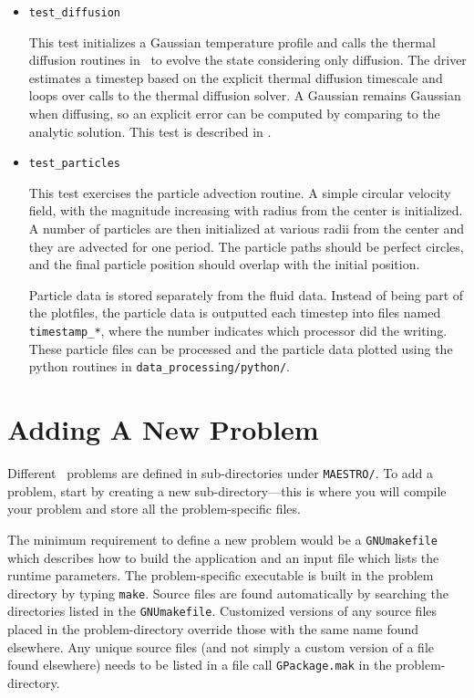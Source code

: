 \begin{itemize}
  
\item {\tt test\_diffusion}

  This test initializes a Gaussian temperature profile and calls
  the thermal diffusion routines in \maestro\ to evolve the state 
  considering only diffusion.  The driver estimates a timestep
  based on the explicit thermal diffusion timescale and loops
  over calls to the thermal diffusion solver.  A Gaussian remains
  Gaussian when diffusing, so an explicit error can be computed
  by comparing to the analytic solution.  This test is 
  described in \cite{xrb}.


\item {\tt test\_particles}

  This test exercises the particle advection routine.  A simple
  circular velocity field, with the magnitude increasing with radius
  from the center is initialized.  A number of particles are then
  initialized at various radii from the center and they are advected
  for one period.  The particle paths should be perfect circles, and
  the final particle position should overlap with the initial
  position.

  Particle data is stored separately from the fluid data.  Instead
  of being part of the plotfiles, the particle data is outputted
  each timestep into files named {\tt timestamp\_*}, where 
  the number indicates which processor did the writing.  These
  particle files can be processed and the particle data plotted
  using the python routines in {\tt data\_processing/python/}.

\end{itemize}


\section{Adding A New Problem}
\label{sec:adding_problems}

Different \maestro\ problems are defined in sub-directories under
{\tt MAESTRO/}.  To add a problem, start by creating a new
sub-directory---this is where you will compile your problem and
store all the problem-specific files.

The minimum requirement to
define a new problem would be a {\tt GNUmakefile} which describes how
to build the application and an input file which lists the runtime
parameters.  The problem-specific executable is built in the problem
directory by typing {\tt make}.  Source files are found automatically
by searching the directories listed in the {\tt GNUmakefile}.
Customized versions of any source files placed in the problem-directory
override those with the same name found elsewhere.  Any unique
source files (and not simply a custom version of a file found
elsewhere) needs to be listed in a file call {\tt GPackage.mak}
in the problem-directory.

